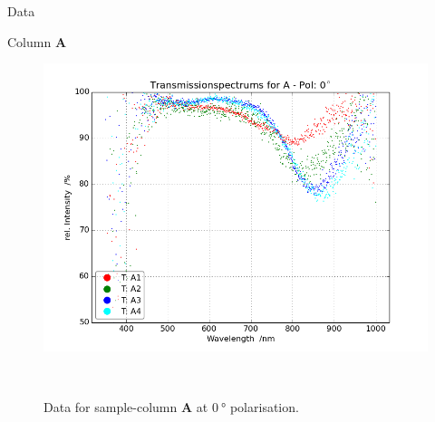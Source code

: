 \begin{appendix}
  \label{Anhang}
  
  
  
  \begin{chapter}{Data}
    \label{Appendix:Data}
    
    
    \newpage
    \begin{section}{Column \textbf{A}}
      \label{Appendix:DataA}
      
      \begin{figure}[ht!]
        \centering
        \begin{minipage}{.92\textwidth}
          \centering
          \includegraphics[width=\textwidth]{Figures/TransspecRAW_APol0.png}
          \caption{Data for sample-column \textbf{A} at $\SI{0}{\degree}$
              polarisation.}
          \label{fig:TransspecRAW_APol0}
        \end{minipage}\\
        \begin{minipage}{.92\textwidth}
          \centering

\end{minipage}
\end{figure}
\end{section}
\end{chapter}
\end{appendix}
